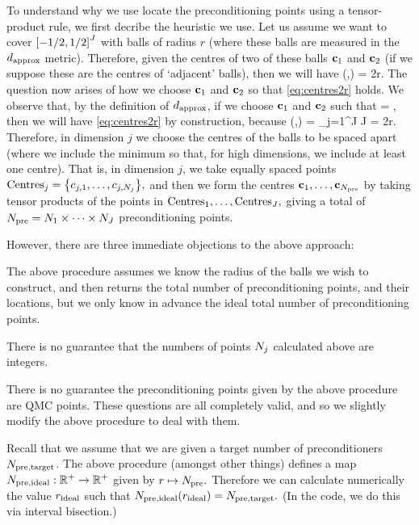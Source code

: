 To understand why we use locate the preconditioning points using a tensor-product rule, we first decribe the heuristic we use. Let us assume we want to cover $\cube{J}$ with balls of radius $r$ (where these balls are measured in the $d_{\mathrm{approx}}$ metric). Therefore, given the centres of two of these balls $\mathbf{c}_{1}$ and $\mathbf{c}_{2}$ (if we suppose these are the centres of `adjacent' balls), then we will have
\beq\label{eq:centres2r}
\dapprox(\bcone,\bct) = 2r.
\eeq
The question now arises of how we choose $\mathbf{c}_{1}$ and $\mathbf{c}_{2}$ so that \cref{eq:centres2r} holds. We observe that, by the definition of $d_{\mathrm{approx}}$, if we choose $\mathbf{c}_{1}$ and $\mathbf{c}_{2}$ such that
\beqs
\sqrt{\lambdaj} = ,
\eeqs
then we will have \cref{eq:centres2r} by construction, because
\beqs
\dapprox(\bcone,\bct) = \sum_{j=1}^J J = 2r.
\eeqs
Therefore, in dimension $j$ we choose the centres of the balls to be spaced
\beqs
\min{}
\eeqs
apart (where we include the minimum so that, for high dimensions, we include at least one centre). That is, in dimension $j$, we take
\beqs
\Nj \de \max{}
\eeqs
equally spaced points $\centresj = \set{c_{j,1},\ldots,c_{j,\Nj}},$ and then we form the centres $\mathbf{c}_{1},\ldots,\mathbf{c}_{N_{\mathrm{pre}}}$ by taking tensor products of the points in $\mathrm{Centres}_{1},\ldots,\mathrm{Centres}_{J},$ giving a total of $N_{\mathrm{pre}} = N_{1} \times \cdots \times N_{J}$ preconditioning points.

However, there are three immediate objections to the above approach:
\ben
\item The above procedure assumes we know the radius of the balls we wish to construct, and then returns the total number of preconditioning points, and their locations, but we only know in advance the ideal total number of preconditioning points.
\item There is no guarantee that the numbers of points $N_{j}$ calculated above are integers.
  \item There is no guarantee the preconditioning points given by the above procedure are QMC points.
    \een
    These questions are all completely valid, and so we slightly modify the above procedure to deal with them.

    Recall that we assume that we are given a target number of preconditioners $N_{\mathrm{pre,target}}$. The above procedure (amongst other things) defines a map $N_{\mathrm{pre,ideal}}:\mathbb R^{+} \rightarrow \mathbb R^{+}$ given by $r \mapsto N_{\mathrm{pre}}.$ Therefore we can calculate numerically the value $r_{\mathrm{ideal}}$ such that $N_{\mathrm{pre,ideal}}(r_{\mathrm{ideal}}) = N_{\mathrm{pre,target}}.$ (In the code, we do this via interval bisection.)


